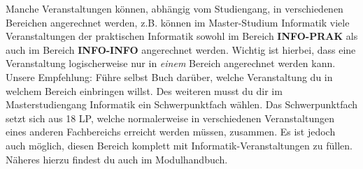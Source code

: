 \fi

\ifinfo
Manche Veranstaltungen können, abhängig vom Studiengang, in verschiedenen Bereichen angerechnet werden, z.B. können im Master-Studium Informatik viele Veranstaltungen der praktischen Informatik sowohl im Bereich \textbf{INFO-PRAK} als auch im Bereich \textbf{INFO-INFO} angerechnet werden. Wichtig ist hierbei, dass eine Veranstaltung logischerweise nur in \emph{einem} Bereich angerechnet werden kann. Unsere Empfehlung: Führe selbst Buch darüber, welche Veranstaltung du in welchem Bereich einbringen willst. 
Des weiteren musst du dir im Masterstudiengang Informatik ein Schwerpunktfach wählen. Das Schwerpunktfach setzt sich aus 18 LP, welche normalerweise in verschiedenen Veranstaltungen eines anderen Fachbereichs erreicht werden müssen, zusammen. Es ist jedoch auch möglich, diesen Bereich komplett mit Informatik-Veranstaltungen zu füllen. Näheres hierzu findest du auch im Modulhandbuch. 

\fi\ 

